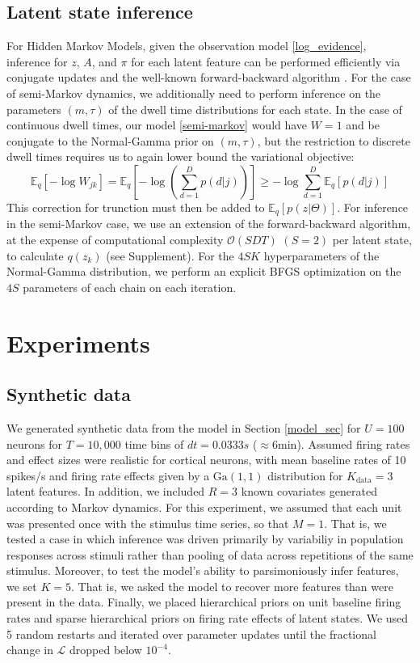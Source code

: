 \documentclass[10pt,letterpaper]{article}
\begin{document}
\subsection*{Latent state inference}
For Hidden Markov Models, given the observation model \ref{log_evidence}, inference for $z$, $A$, and $\pi$ for each latent feature can be performed efficiently via conjugate updates and the well-known forward-backward algorithm \cite{beal2003variational}. For the case of semi-Markov dynamics, we additionally need to perform inference on the parameters $(m, \tau)$ of the dwell time distributions for each state. In the case of continuous dwell times, our model \ref{semi-markov} would have $W = 1$ and be conjugate to the Normal-Gamma prior on $(m, \tau)$, but the restriction to discrete dwell times requires us to again lower bound the variational objective:
\begin{equation}
    \mathbb{E}_q\left[-\log W_{jk} \right] = 
    \mathbb{E}_q\left[- \log \left( \sum_{d=1}^D p(d|j)\right) \right]
    \ge -\log \sum_{d = 1}^D \mathbb{E}_q\left[p(d|j)\right]
\end{equation}
This correction for trunction must then be added to $\mathbb{E}_q[p(z|\Theta)]$. For inference in the semi-Markov case, we use an extension of the forward-backward algorithm\cite{Yu2006-bb}, at the expense of computational complexity $\mathcal{O}(SDT)$ $(S = 2)$ per latent state, to calculate $q(z_k)$ (see Supplement). For the $4SK$ hyperparameters of the Normal-Gamma distribution, we perform an explicit BFGS optimization on the $4S$ parameters of each chain on each iteration.


\section*{Experiments}
\subsection*{Synthetic data}
We generated synthetic data from the model in Section \ref{model_sec} for $U=100$ neurons for $T=10,000$ time bins of $dt=0.0333s$ ($\approx 6$min). Assumed firing rates and effect sizes were realistic for cortical neurons, with mean baseline rates of 10 spikes/s and firing rate effects given by a $\text{Ga}(1, 1)$ distribution for $K_{\text{data}}=3$ latent features. In addition, we included $R=3$ known covariates generated according to Markov dynamics. For this experiment, we assumed that each unit was presented once with the stimulus time series, so that $M = 1$. That is, we tested a case in which inference was driven primarily by variabiliy in population responses across stimuli rather than pooling of data across repetitions of the same stimulus. Moreover, to test the model's ability to parsimoniously infer features, we set $K=5$. That is, we asked the model to recover more features than were present in the data. Finally, we placed hierarchical priors on unit baseline firing rates and sparse hierarchical priors on firing rate effects of latent states. We used 5 random restarts and iterated over parameter updates until the fractional change in $\mathcal{L}$ dropped below $10^{-4}$.
\end{document}
